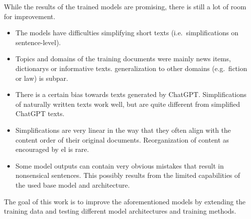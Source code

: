 While the results of the trained models are promising, there is still a lot of room for improvement.
\begin{itemize}[noitemsep]
    \item The models have difficulties simplifying short texts (i.e.\ simplifications on sentence-level).
    \item Topics and domains of the training documents were mainly news items, dictionarys or informative texts.
    \gls{generalization} to other domains (e.g.\ fiction or law) is subpar.
    \item There is a certain bias towards texts generated by ChatGPT.
    Simplifications of naturally written texts work well, but are quite different from simplified ChatGPT texts.
    \item Simplifications are very linear in the way that they often align with the content order of their original documents.
    Reorganization of content as encouraged by \gls{el} is rare.
    \item Some model outputs can contain very obvious mistakes that result in nonsensical sentences.
    This possibly results from the limited capabilities of the used base model and architecture.
\end{itemize}

The goal of this work is to improve the aforementioned models by extending the training data and testing different model architectures and training methods.


%
